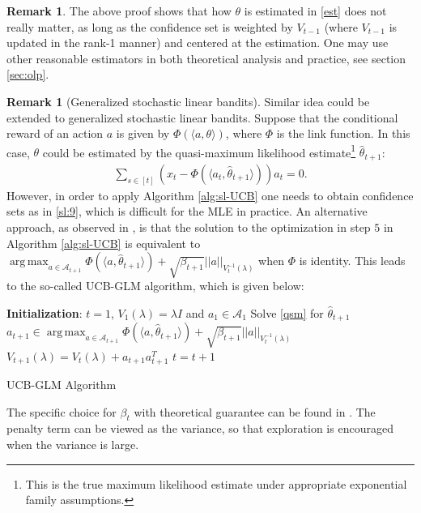 \documentclass[letterpaper,11pt,openright,openany]{book}
\numberwithin{equation}{section}
\theoremstyle{plain}
\theoremstyle{definition}
\newtheorem{Rem}[Th]{Remark}
\def\t{{\theta}}
\DeclareMathOperator*{\argmax}{arg\,max}
\begin{document}
\begin{Rem}\label{2.9}
The above proof shows that how $\t$ is estimated in \eqref{est} does not really matter, as long as the confidence set is weighted by $V_{t-1}$ (where $V_{t-1}$ is updated in the rank-1 manner) and centered at the estimation. One may use other reasonable estimators in both theoretical analysis and practice, see section \ref{sec:olp}. 
\end{Rem}

\begin{Rem}[Generalized stochastic linear bandits]
Similar idea could be extended to generalized stochastic linear bandits. Suppose that the conditional reward of an action $a$ is given by $\Phi(\langle a, \t\rangle)$, where $\Phi$ is the link function. In this case, $\t$ could be estimated by the quasi-maximum likelihood estimate\footnote{This is the true maximum likelihood estimate under appropriate exponential family assumptions.} $\hat{\t}_{t+1}$:
\begin{align}
\sum_{s\in [t]}\left(x_t-\Phi(\langle a_t, \hat{\t}_{t+1}\rangle)\right)a_t = 0. \label{qsm}
\end{align}
However, in order to apply Algorithm \ref{alg:sl-UCB} one needs to obtain confidence sets as in \eqref{sl:9}, which is difficult for the MLE in practice. 
An alternative approach, as observed in \cite{filippi2010parametric}, is that the solution to the optimization in step $5$ in Algorithm \ref{alg:sl-UCB} is equivalent to $\argmax_{a\in\mathcal A_{t+1}}\Phi(\langle a, \hat{\t}_{t+1}\rangle)+\sqrt{\beta_ {t+1}}||a||_{V_t^{-1}(\lambda)}$ when $\Phi$ is identity. This leads to the so-called UCB-GLM algorithm, which is given below:

\begin{algorithm}[H]
\begin{algorithmic}[1]
\STATE  \textbf{Initialization}: $t=1$, $V_1(\lambda) = \lambda I$ and $a_1\in\mathcal A_1$
\STATE Solve \eqref{qsm} for $\hat{\t}_{t+1}$
\STATE $a_{t+1} \in \argmax_{a\in\mathcal A_{t+1}}\Phi(\langle a, \hat{\t}_{t+1}\rangle)+\sqrt{\beta_ {t+1}}||a||_{V_t^{-1}(\lambda)}$
\STATE $V_{t+1}(\lambda) = V_{t}(\lambda)+a_{t+1}a_{t+1}^T$ 
\STATE $t = t +1$
\ENDWHILE
\end{algorithmic}
\caption{UCB-GLM Algorithm} 
\label{alg:sl-UCB-GLM}
\end{algorithm}
The specific choice for $\beta_t$ with theoretical guarantee can be found in \cite{filippi2010parametric, li2017provably}. The penalty term can be viewed as the variance, so that exploration is encouraged when the variance is large. 
\end{Rem}
\end{document}
